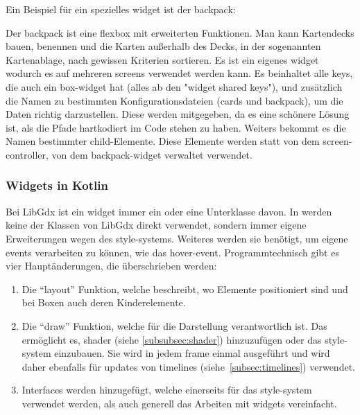 Ein Beispiel für ein spezielles widget ist der backpack:
Der backpack ist eine flexbox mit erweiterten Funktionen.
Man kann Kartendecks bauen, benennen und die Karten außerhalb des Decks, in der sogenannten Kartenablage, nach gewissen Kriterien sortieren.
Es ist ein eigenes widget wodurch es auf mehreren screens verwendet werden kann.
Es beinhaltet alle keys, die auch ein box-widget hat (alles ab den "widget shared keys"), und zusätzlich die Namen zu bestimmten Konfigurationsdateien (cards und backpack), um die Daten richtig darzustellen.
Diese werden mitgegeben, da es eine schönere Lösung ist, als die Pfade hartkodiert im Code stehen zu haben.
Weiters bekommt es die Namen bestimmter child-Elemente.
Diese Elemente werden statt von dem screen-controller, von dem backpack-widget verwaltet \bzw verwendet.

\renewcommand{\kapitelautor}{Autor: Felix Zwickelstorfer}
\subsubsection{Widgets in Kotlin}\label{subsubsec:widgetsinkotlin}
\renewcommand{\kapitelautor}{Autor: Felix Zwickelstorfer}
Bei LibGdx ist ein widget immer ein  oder eine Unterklasse davon.
In \FF werden keine der Klassen von LibGdx direkt verwendet, sondern immer eigene Erweiterungen \zB wegen des style-systems.
Weiteres werden sie benötigt, um eigene events verarbeiten zu können, wie das hover-event.
Programmtechnisch gibt es vier Hauptänderungen, die überschrieben werden:
\begin{enumerate}
    \item Die ``layout'' Funktion, welche beschreibt, wo Elemente positioniert sind und bei Boxen auch deren Kinderelemente.
    \item Die ``draw'' Funktion, welche für die Darstellung verantwortlich ist. Das ermöglicht es, shader (siehe \ref{subsubsec:shader}) hinzuzufügen oder das style-system einzubauen.
    Sie wird in jedem frame einmal ausgeführt und wird daher ebenfalls für updates von timelines (siehe~\ref{subsec:timelines}) verwendet.
    \item Interfaces werden hinzugefügt, welche einerseits für das style-system verwendet werden, als auch generell das Arbeiten mit widgets vereinfacht.
\end{enumerate}
\renewcommand{\kapitelautor}{Autor: Felix Zwickelstorfer}
